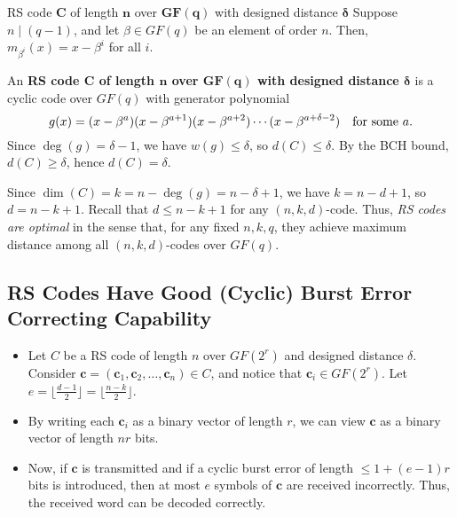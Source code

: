 \begin{Definition}{RS code $ \symbf{C} $ of length $ \symbf{n} $ over $ \symbf{GF(q)} $
        with designed distance $ \symbf{\delta} $}{}
    Suppose $ n\mid (q-1) $, and let $ \beta\in GF(q) $ be an element of order $ n $.
    Then, $ m_{\beta^i}(x)=x-\beta^i $ for all $ i $.

    \vspace{1mm}

    An
    \textbf{RS code $ \symbf{C} $ of length $ \symbf{n} $ over $ \symbf{GF(q)} $
        with designed distance $ \symbf{\delta} $} is a cyclic code over $ GF(q) $
    with generator polynomial
    \[ g(x)=(x-\beta^{a})(x-\beta^{a+1})(x-\beta^{a+2})\cdots
        (x-\beta^{a+\delta-2})\quad\text{for some $ a $.} \]
    Since $ \deg(g)=\delta-1 $, we have $ w(g)\leqslant \delta $,
    so $ d(C)\leqslant \delta $.
    By the BCH bound, $ d(C)\geqslant \delta $, hence $ d(C)=\delta $.
\end{Definition}
Since $ \dim(C)=k=n-\deg(g)=n-\delta+1 $, we have $ k=n-d+1 $,
so $ d=n-k+1 $. Recall that $ d\leqslant n-k+1 $ for any $ (n,k,d) $-code.
Thus, \emph{RS codes are optimal} in the sense that, for any fixed $ n,k,q $,
they achieve maximum distance among all $ (n,k,d) $-codes over $ GF(q) $.

\subsection*{RS Codes Have Good (Cyclic) Burst Error Correcting Capability}
\begin{itemize}
    \item Let $ C $ be a RS code of length $ n $ over $ GF(2^r) $ and designed
          distance $ \delta $. Consider $ \symbf{c}=(\symbf{c}_1,\symbf{c}_2,\ldots ,\symbf{c}_n)\in C $,
          and notice that $ \symbf{c}_i\in GF(2^r) $.
          Let $ e=\lfloor\frac{d-1}{2} \rfloor =\lfloor\frac{n-k}{2} \rfloor $.
    \item By writing each $ \symbf{c}_i $ as a binary vector of length
          $ r $, we can view $ \symbf{c} $ as a binary vector of length $ nr $ bits.

    \item Now, if $ \symbf{c} $ is transmitted and if a cyclic burst error of length
          $ \leqslant 1+(e-1)r $ bits is introduced, then at most $ e $
          symbols of $ \symbf{c} $ are received incorrectly. Thus, the received
          word can be decoded correctly.
\end{itemize}

